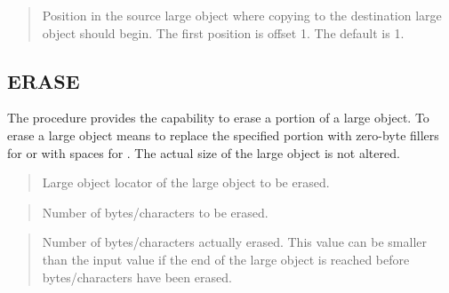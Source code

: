 \documentclass[letterpaper,10pt,english,openany,oneside]{sphinxmanual}
\begin{document}
\begin{quote}

Position in the source large object where copying to the destination
large object should begin. The first position is offset 1. The default
is 1.
\end{quote}

\newpage


\subsection{ERASE}
\label{\detokenize{erase::doc}}\label{\detokenize{erase:erase}}
The  procedure provides the capability to erase a portion of a
large object. To erase a large object means to replace the specified
portion with zero-byte fillers for  or with spaces for . The
actual size of the large object is not altered.
\begin{quote}

\begin{quote}

\end{quote}
\end{quote}


\begin{quote}

Large object locator of the large object to be erased.
\end{quote}

\begin{quote}

Number of bytes/characters to be erased.
\end{quote}

\begin{quote}

Number of bytes/characters actually erased. This value can be smaller
than the input value if the end of the large object is reached before
 bytes/characters have been erased.
\end{quote}
\end{document}
